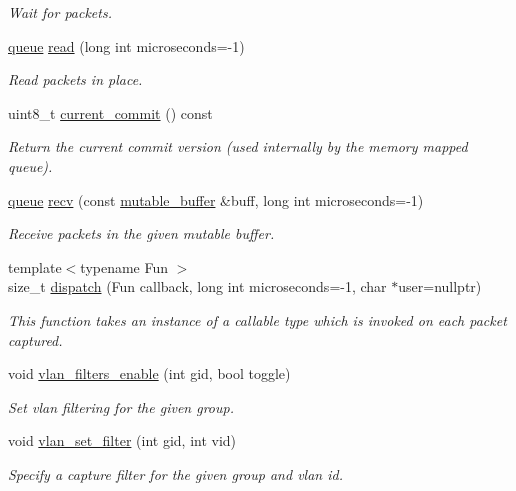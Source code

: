 \begin{DoxyCompactItemize}
\begin{DoxyCompactList}\small\item\em Wait for packets. \end{DoxyCompactList}\item 
\hyperlink{classnet_1_1queue}{queue} \hyperlink{classnet_1_1pfq_aa5f1f823256285ebd45d47e454ce7bd4}{read} (long int microseconds=-\/1)
\begin{DoxyCompactList}\small\item\em Read packets in place. \end{DoxyCompactList}\item 
uint8\+\_\+t \hyperlink{classnet_1_1pfq_a31aa0b2b6221c4b70ade77ad00e2761b}{current\+\_\+commit} () const 
\begin{DoxyCompactList}\small\item\em Return the current commit version (used internally by the memory mapped queue). \end{DoxyCompactList}\item 
\hyperlink{classnet_1_1queue}{queue} \hyperlink{classnet_1_1pfq_a858804361efdbd149b838940319be49c}{recv} (const \hyperlink{namespacenet_ac0df3fa0efbc044d8a2441906e8f61cb}{mutable\+\_\+buffer} \&buff, long int microseconds=-\/1)
\begin{DoxyCompactList}\small\item\em Receive packets in the given mutable buffer. \end{DoxyCompactList}\item 
{\footnotesize template$<$typename Fun $>$ }\\size\+\_\+t \hyperlink{classnet_1_1pfq_af96974c25658386b3ad994b0de43f4b2}{dispatch} (Fun callback, long int microseconds=-\/1, char $\ast$user=nullptr)
\begin{DoxyCompactList}\small\item\em This function takes an instance of a callable type which is invoked on each packet captured. \end{DoxyCompactList}\item 
void \hyperlink{classnet_1_1pfq_ae70dad67b0f243e604ffc6d94a888454}{vlan\+\_\+filters\+\_\+enable} (int gid, bool toggle)
\begin{DoxyCompactList}\small\item\em Set vlan filtering for the given group. \end{DoxyCompactList}\item 
void \hyperlink{classnet_1_1pfq_ae659846711122122b7a086f70e4b2375}{vlan\+\_\+set\+\_\+filter} (int gid, int vid)
\begin{DoxyCompactList}\small\item\em Specify a capture filter for the given group and vlan id. \end{DoxyCompactList}\item 

\end{DoxyCompactItemize}
